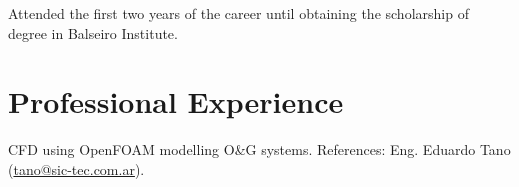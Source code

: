 \documentclass[11pt,a4paper,sans]{moderncv}        %
\begin{document}
{Attended the first two years of the career until obtaining the scholarship of degree in Balseiro Institute.}




\section{Professional Experience}

{CFD using OpenFOAM modelling O\&G systems.\newline{}
References: Eng. Eduardo Tano (\href{mailto:tano@sic-tec.com.ar}{tano@sic-tec.com.ar}).}
\end{document}
